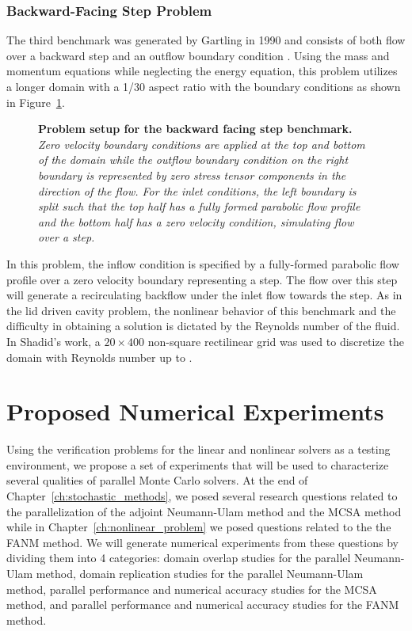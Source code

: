 \subsubsection{Backward-Facing Step Problem}
\label{subsubsec:backward_facing_step}
The third benchmark was generated by Gartling in 1990 and consists of
both flow over a backward step and an outflow boundary condition
\citep{gartling_test_1990}. Using the mass and momentum equations
while neglecting the energy equation, this problem utilizes a longer
domain with a 1/30 aspect ratio with the boundary conditions as shown
in Figure~\ref{fig:backward_facing_step}.
\begin{figure}[htpb!]
  \begin{center}
    \scalebox{1.3}{
       }
  \end{center}
  \caption{\textbf{Problem setup for the backward facing step
      benchmark.} \textit{Zero velocity boundary conditions are
      applied at the top and bottom of the domain while the outflow
      boundary condition on the right boundary is represented by zero
      stress tensor components in the direction of the flow. For the
      inlet conditions, the left boundary is split such that the top
      half has a fully formed parabolic flow profile and the bottom
      half has a zero velocity condition, simulating flow over a
      step.}}
  \label{fig:backward_facing_step}
\end{figure}
In this problem, the inflow condition is specified by a fully-formed
parabolic flow profile over a zero velocity boundary representing a
step. The flow over this step will generate a recirculating backflow
under the inlet flow towards the step. As in the lid driven cavity
problem, the nonlinear behavior of this benchmark and the difficulty
in obtaining a solution is dictated by the Reynolds number of the
fluid. In Shadid's work, a $20 \times 400$ non-square rectilinear grid
was used to discretize the domain with Reynolds number up to
.

\section{Proposed Numerical Experiments}
\label{sec:numerical_experiments}
Using the verification problems for the linear and nonlinear solvers
as a testing environment, we propose a set of experiments that will be
used to characterize several qualities of parallel Monte Carlo
solvers. At the end of Chapter~\ref{ch:stochastic_methods}, we posed
several research questions related to the parallelization of the
adjoint Neumann-Ulam method and the MCSA method while in
Chapter~\ref{ch:nonlinear_problem} we posed questions related to the
the FANM method. We will generate numerical experiments from these
questions by dividing them into 4 categories: domain overlap studies
for the parallel Neumann-Ulam method, domain replication studies for
the parallel Neumann-Ulam method, parallel performance and numerical
accuracy studies for the MCSA method, and parallel performance and
numerical accuracy studies for the FANM method.

